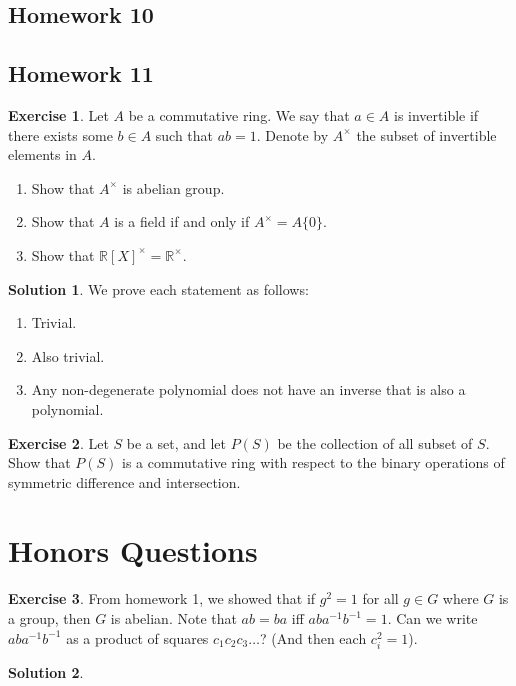 \documentclass[12pt]{article}
\theoremstyle{definition}
\newcommand{\R}{\mathbb{R}}
\newtheorem{exercise}{\color{YellowOrange}Exercise}
\theoremstyle{definition}
\newtheorem{solution}{\color{Goldenrod}Solution}
\begin{document}
\subsection{Homework 10}

\subsection{Homework 11}
\begin{exercise}
	Let $A$ be a commutative ring. We say that $a \in A$ is invertible if there exists some $b \in A$ such that $ab = 1$. Denote by $A^{\times}$ the subset of invertible elements in $A$. 
	\begin{enumerate}
		\item Show that $A^{\times}$ is abelian group.
		\item Show that $A$ is a field if and only if $A^{\times} = A \{0\}$.
		\item Show that $\R[X]^{\times} = \R^{\times}$.
	\end{enumerate}
\end{exercise}
\begin{solution}
We prove each statement as follows:
\begin{enumerate}
	\item Trivial.
	\item Also trivial.
	\item Any non-degenerate polynomial does not have an inverse that is also a polynomial.
\end{enumerate}
\end{solution}

\begin{exercise}
	Let $S$ be a set, and let $P(S)$ be the collection of all subset of $S$. Show that $P(S)$ is a commutative ring with respect to the binary operations of symmetric difference and intersection. 
\end{exercise}

\section{Honors Questions}
\begin{exercise}
From homework 1, we showed that if $g^2 = 1$ for all $g \in G$ where $G$ is a group, then $G$ is abelian. Note that $ab = ba$ iff $aba^{-1}b^{-1} = 1$. Can we write $aba^{-1}b^{-1}$ as a product of squares $c_1 c_2 c_3 \ldots $? (And then each $c^2_i = 1$).
\end{exercise}
\begin{solution}

\end{solution}
\end{document}

